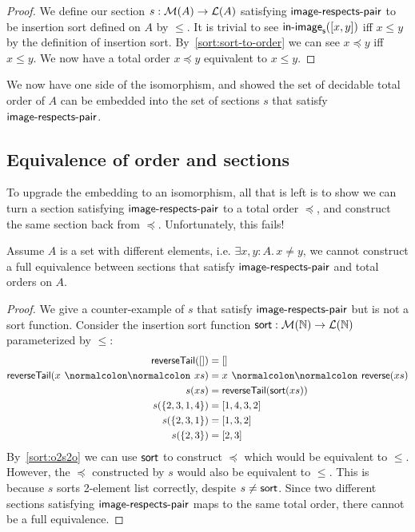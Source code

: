 \begin{proof}
    We define our section $s : \mathcal{M}(A) \to \mathcal{L}(A)$ satisfying $\operatorname{\mathsf{image-respects-pair}}$ to be
    insertion sort defined on $A$ by $\leq$.
    It is trivial to see $\operatorname{\mathsf{in-image}}_{\operatorname{\mathsf{s}}}([x, y])$ iff $x \leq y$ by the definition
    of insertion sort. By~\cref{sort:sort-to-order} we can see $x \preccurlyeq y$ iff $x \leq y$.
    We now have a total order $x \preccurlyeq y$ equivalent to $x \leq y$.
\end{proof}

We now have one side of the isomorphism, and showed the set of decidable total order of $A$
can be embedded into the set of sections $s$ that satisfy $\operatorname{\mathsf{image-respects-pair}}$.

\subsection{Equivalence of order and sections}
To upgrade the embedding to an isomorphism, all that is left
is to show we can turn a section satisfying $\operatorname{\mathsf{image-respects-pair}}$ to a total order $\preccurlyeq$, and construct the
same section back from $\preccurlyeq$. Unfortunately, this fails!

\begin{proposition}
    Assume $A$ is a set with different elements, i.e. $\exists x, y: A.\,x \neq y$,
    we cannot construct a full equivalence between sections that satisfy $\operatorname{\mathsf{image-respects-pair}}$
    and total orders on $A$.
\end{proposition}

\begin{proof}
    We give a counter-example of $s$ that satisfy $\operatorname{\mathsf{image-respects-pair}}$ but is not a sort function.
    Consider the insertion sort function $\operatorname{\mathsf{sort}} : \mathcal{M}(\mathbb{N}) \to \mathcal{L}(\mathbb{N})$
    parameterized by $\leq$:
    \begin{align*}
        \term{reverseTail}([])         & = []                                  \\
        \term{reverseTail}(x \cons xs) & = x \cons \term{reverse}(xs)          \\
        s(xs)                          & = \term{reverseTail}(\term{sort}(xs)) \\
        s(\{2,3,1,4\})                 & = [1,4,3,2]                           \\
        s(\{2,3,1\})                   & = [1, 3, 2]                           \\
        s(\{2,3\})                     & = [2, 3]                              \\
    \end{align*}
    By~\cref{sort:o2s2o} we can use $\operatorname{\mathsf{sort}}$ to construct $\preccurlyeq$ which would be
    equivalent to $\leq$. However, the $\preccurlyeq$ constructed by $s$ would also be equivalent
    to $\leq$. This is because $s$ sorts 2-element list correctly, despite $s \neq \operatorname{\mathsf{sort}}$.
    Since two different sections satisfying $\operatorname{\mathsf{image-respects-pair}}$ maps to the same total order,
    there cannot be a full equivalence.
\end{proof}


